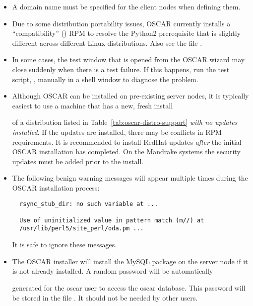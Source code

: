 \begin{itemize}
\item A domain name must be specified for the client nodes when
  defining them.

\item Due to some distribution portability issues, OSCAR currently installs
  a ``compatibility''  () RPM to resolve the
  Python2 prerequisite that is slightly different across different Linux
  distributions.  Also see the file .

\item In some cases, the test window that is opened from the
  OSCAR wizard may close suddenly when there is a test failure. If
  this happens, run the test script, ,
  manually in a shell window to diagnose the problem.

\item Although OSCAR can be installed on pre-existing server nodes, it
  is typically easiest to use a machine that has a new, fresh install

  of a distribution listed in Table~\ref{tab:oscar-distro-support}
  {\em with no updates installed}.  If the updates are installed,
  there may be conflicts in RPM requirements.  It is recommended to
  install RedHat updates {\em after} the initial OSCAR installation has
  completed.  On the Mandrake systems the security updates must be added
  prior to the install.

\item The following benign warning messages will appear multiple times
  during the OSCAR installation process:

\begin{verbatim}
  rsync_stub_dir: no such variable at ...

  Use of uninitialized value in pattern match (m//) at
  /usr/lib/perl5/site_perl/oda.pm ...
\end{verbatim}
\endchange

  It is safe to ignore these messages.

\item The OSCAR installer will install the MySQL package on the server
  node if it is not already installed.  A random password will be automatically

  generated for the oscar user to access the oscar database.  This
  password will be stored in the file .  It should
  not be needed by other users.
\endchange


\end{itemize}
